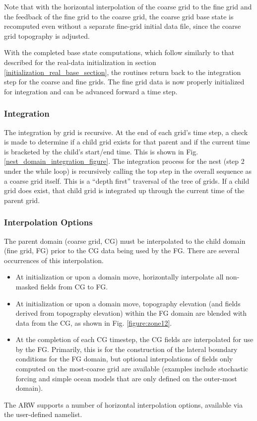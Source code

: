 Note that with the horizontal interpolation of the coarse grid 
to the fine grid and the feedback of the fine grid to the coarse 
grid, 
the coarse grid base state is recomputed 
even without a separate fine-grid initial data file, 
since the coarse grid topography is adjusted.

With the completed base state computations, which follow similarly to
that described for the real-data initialization in section
\ref{initialization_real_base_section},
the routines return 
back to the integration step for the coarse and fine grids.
The fine grid data is now properly initialized for integration and
can be advanced forward a time step.

\subsubsection{Integration}

The integration by grid is recursive.  At the end of each grid's time step, a check
is made to determine if a child grid exists for that parent and if the
current time is bracketed by the child's start/end time.  
This is shown in Fig. \ref{nest_domain_integration_figure}.  The integration process for the nest (step 2 under the
while loop) is recursively calling the top step in the overall sequence as a coarse grid itself.
This is a ``depth first'' 
traversal of the tree of grids.
If a child grid does exist, that child grid is integrated up through the current time of 
the parent grid.

\subsubsection{Interpolation Options}

The parent domain (coarse grid, CG) must be interpolated to the child domain 
(fine grid, FG) prior to the CG data being used by the FG. There are several 
occurrences of this interpolation.
\begin{itemize}\setlength{\parskip}{-4pt}
\item At initialization or upon a domain move, horizontally interpolate all 
non-masked fields from CG to FG.
\item At initialization or upon a domain move, topography elevation (and 
fields derived from topography elevation) within the FG domain are blended 
with data from the CG, as shown in Fig. \ref{figure:zone12}.
\item At the completion of each CG timestep, the CG fields are interpolated
for use by the FG. Primarily, this is for the construction of the lateral boundary 
conditions for the FG domain, but optional interpolations of fields only computed 
on the most-coarse grid are available (examples include stochastic forcing and 
simple ocean models that are only defined on the outer-most domain).
\end{itemize}
\noindent 
The ARW supports a number of horizontal interpolation options, available via
the user-defined namelist.
